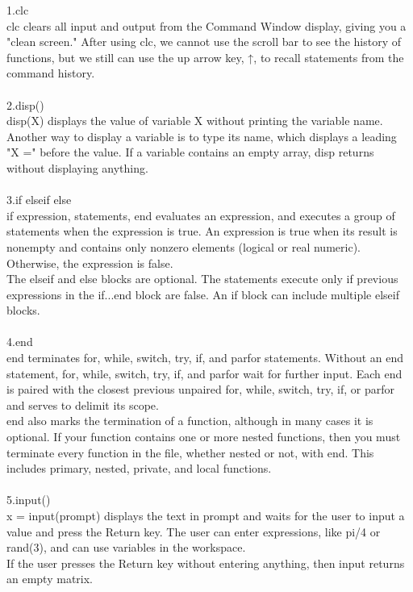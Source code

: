 \documentclass[12pt]{article}
\begin{document}
1.clc\\
 clc clears all input and output from the Command Window display, giving you a "clean screen." After using clc, we cannot use the scroll bar to see the history of functions, but we still can use the up arrow key, ↑, to recall statements from the command history.\\\\
2.disp()\\
disp(X) displays the value of variable X without printing the variable name. Another way to display a variable is to type its name, which displays a leading "X =" before the value. If a variable contains an empty array, disp returns without displaying anything.\\\\
3.if \thinspace\thinspace elseif \thinspace\thinspace else \\
if expression, statements, end evaluates an expression, and executes a group of statements when the expression is true. An expression is true when its result is nonempty and contains only nonzero elements (logical or real numeric). Otherwise, the expression is false.\\
The elseif and else blocks are optional. The statements execute only if previous expressions in the if...end block are false. An if block can include multiple elseif blocks.\\\\
4.end\\
end terminates for, while, switch, try, if, and parfor statements. Without an end statement, for, while, switch, try, if, and parfor wait for further input. Each end is paired with the closest previous unpaired for, while, switch, try, if, or parfor and serves to delimit its scope.\\
end also marks the termination of a function, although in many cases it is optional. If your function contains one or more nested functions, then you must terminate every function in the file, whether nested or not, with end. This includes primary, nested, private, and local functions.\\\\
5.input()\\
x = input(prompt) displays the text in prompt and waits for the user to input a value and press the Return key. The user can enter expressions, like pi/4 or rand(3), and can use variables in the workspace.\\
If the user presses the Return key without entering anything, then input returns an empty matrix.\\
\end{document}
